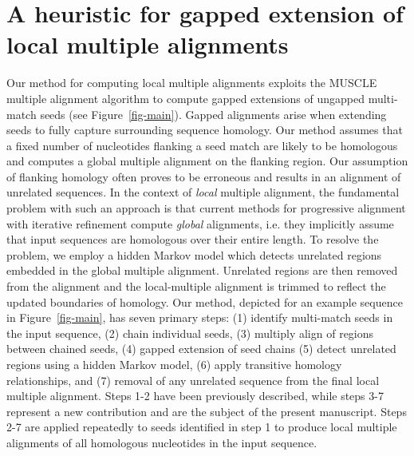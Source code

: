 \documentclass{llncs}
\begin{document}
\section{A heuristic for gapped extension of local multiple alignments}
Our method for computing local multiple alignments exploits the MUSCLE
multiple alignment algorithm to compute gapped extensions of ungapped
multi-match seeds (see Figure~\ref{fig-main}). Gapped alignments arise
when extending seeds to fully capture surrounding sequence
homology. Our method assumes that a fixed number of nucleotides
flanking a seed match are likely to be homologous and computes a
global multiple alignment on the flanking region.  Our assumption of
flanking homology often proves to be erroneous and results in an
alignment of unrelated sequences.  In the context of \textit{local}
multiple alignment, the fundamental problem with such an approach is
that current methods for progressive alignment with iterative
refinement compute \textit{global} alignments, i.e. they implicitly
assume that input sequences are homologous over their entire length.
To resolve the problem, we employ a hidden Markov model which detects
unrelated regions embedded in the global multiple alignment.
Unrelated regions are then removed from the alignment and the
local-multiple alignment is trimmed to reflect the updated boundaries
of homology. Our method, depicted for an example sequence in
Figure~\ref{fig-main}, has seven primary steps: (1) identify
multi-match seeds in the input sequence, (2) chain individual
seeds, (3) multiply align of regions between chained seeds, (4)
gapped extension of seed chains (5) detect unrelated regions
using a hidden Markov model, (6) apply transitive homology
relationships, and (7) removal of any unrelated sequence from
the final local multiple alignment.  Steps 1-2 have been previously
described\cite{ref-procrast}, while steps 3-7 represent a new contribution
and are the subject of the present manuscript. Steps 2-7 are applied
repeatedly to seeds identified in step 1 to produce local multiple
alignments of all homologous nucleotides in the input sequence.
\end{document}
